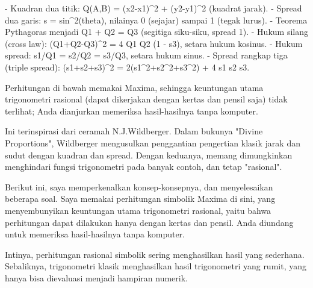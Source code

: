 \documentclass[a4paper,10pt]{article}
\begin{document}
\begin{eulernotebook}
\begin{eulercomment}
\begin{eulercomment}
\begin{eulercomment}
\begin{eulercomment}
\begin{eulercomment}
\begin{eulercomment}
\begin{eulercomment}
\begin{eulercomment}
\begin{eulercomment}
\begin{eulercomment}
\begin{eulercomment}
\begin{eulercomment}
\begin{eulercomment}
- Kuadran dua titik: Q(A,B) = (x2-x1)\textasciicircum{}2 + (y2-y1)\textasciicircum{}2 (kuadrat jarak).
- Spread dua garis: s = sin\textasciicircum{}2(theta), nilainya 0 (sejajar) sampai 1 (tegak lurus).
- Teorema Pythagoras menjadi Q1 + Q2 = Q3 (segitiga siku-siku, spread 1).
- Hukum silang (cross law): (Q1+Q2-Q3)\textasciicircum{}2 = 4 Q1 Q2 (1 - s3), setara hukum kosinus.
- Hukum spread: s1/Q1 = s2/Q2 = s3/Q3, setara hukum sinus.
- Spread rangkap tiga (triple spread): (s1+s2+s3)\textasciicircum{}2 = 2(s1\textasciicircum{}2+s2\textasciicircum{}2+s3\textasciicircum{}2) + 4 s1 s2 s3.

Perhitungan di bawah memakai Maxima, sehingga keuntungan utama trigonometri rasional
(dapat dikerjakan dengan kertas dan pensil saja) tidak terlihat; Anda dianjurkan memeriksa
hasil-hasilnya tanpa komputer.

\end{eulercomment}
\begin{eulercomment}
Ini terinspirasi dari ceramah N.J.Wildberger. Dalam bukunya "Divine Proportions", Wildberger
mengusulkan penggantian pengertian klasik jarak dan sudut dengan kuadran dan spread.
Dengan keduanya, memang dimungkinkan menghindari fungsi trigonometri pada banyak contoh, dan
tetap "rasional".

Berikut ini, saya memperkenalkan konsep-konsepnya, dan menyelesaikan beberapa soal. Saya memakai
perhitungan simbolik Maxima di sini, yang menyembunyikan keuntungan utama trigonometri rasional,
yaitu bahwa perhitungan dapat dilakukan hanya dengan kertas dan pensil. Anda diundang untuk
memeriksa hasil-hasilnya tanpa komputer.

Intinya, perhitungan rasional simbolik sering menghasilkan hasil yang sederhana. Sebaliknya,
trigonometri klasik menghasilkan hasil trigonometri yang rumit, yang hanya bisa dievaluasi
menjadi hampiran numerik.


\end{eulercomment}
\end{eulercomment}
\end{eulercomment}
\end{eulercomment}
\end{eulercomment}
\end{eulercomment}
\end{eulercomment}
\end{eulercomment}
\end{eulercomment}
\end{eulercomment}
\end{eulercomment}
\end{eulercomment}
\end{eulercomment}
\end{eulernotebook}
\end{document}
